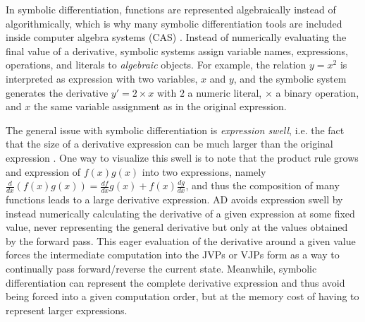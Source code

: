 In symbolic differentiation, functions are represented algebraically instead of algorithmically, which is why many symbolic differentiation tools are included inside computer algebra systems (CAS) \cite{Symbolics_jl_2022}. 
Instead of numerically evaluating the final value of a derivative, symbolic systems assign variable names, expressions, operations, and literals to \textit{algebraic} objects. 
For example, the relation $y = x^2$ is interpreted as expression with two variables, $x$ and $y$, and the symbolic system generates the derivative $y' = 2 \times x$ with $2$ a numeric literal, $\times$ a binary operation, and $x$ the same variable assignment as in the original expression.

The general issue with symbolic differentiation is \textit{expression swell}, i.e. the fact that the size of a derivative expression can be much larger than the original expression \cite{Baydin_Pearlmutter_Radul_Siskind_2015}. 
One way to visualize this swell is to note that the product rule grows and expression of $f(x)g(x)$ into two expressions, namely $\frac{d}{dx}(f(x)g(x)) = \frac{df}{dx}g(x) + f(x)\frac{dg}{dx}$, and thus the composition of many functions leads to a large derivative expression. 
AD avoids expression swell by instead numerically calculating the derivative of a given expression at some fixed value, never representing the general derivative but only at the values obtained by the forward pass. 
This eager evaluation of the derivative around a given value forces the intermediate computation into the JVPs or VJPs form as a way to continually pass forward/reverse the current state. 
Meanwhile, symbolic differentiation can represent the complete derivative expression and thus avoid being forced into a given computation order, but at the memory cost of having to represent larger expressions.

